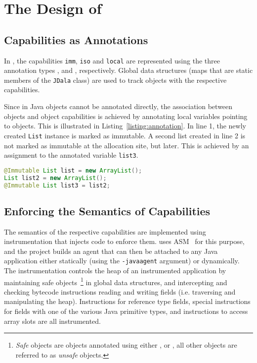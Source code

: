 \section{The Design of \jdala}
\label{sec:design}	


\subsection{Capabilities as Annotations}
\label{subsection:capabilitesAsAnnotations}

In \jdala, the \dala capabilities \texttt{imm}, \texttt{iso} and \texttt{local} are represented using the three  annotation types \Immutable, \Isolated and \Local, respectively.  Global data structures (maps that are static members of the \texttt{JDala} class) are used to track objects with the respective capabilities.   

Since in Java  objects cannot be annotated directly, the association between objects and object capabilities is achieved by annotating local variables pointing to objects.  This is illustrated in Listing~\ref{listing:annotation}.  In line 1, the newly created \texttt{List} instance is marked as immutable.  A second list created in line 2 is not marked as immutable at the allocation site, but later. This is achieved by an assignment to the annotated variable \texttt{list3}. 


\begin{lstlisting}[language=Java, caption=Associating objects with capabilities, label=listing:annotation]
@Immutable List list = new ArrayList();
List list2 = new ArrayList();
@Immutable List list3 = list2;
\end{lstlisting}


\subsection{Enforcing the Semantics of Capabilities}

The semantics of the respective capabilities are implemented using instrumentation that injects code to enforce them. 
\jdala uses ASM~\cite{bruneton2002asm} for this purpose, and the project builds an agent that can then be attached to any Java application either statically (using the \texttt{-javaagent} argument) or dynamically.
The instrumentation controls the heap of an instrumented application by maintaining safe objects~\footnote{\textit{Safe} objects are objects annotated using either \Immutable, \Isolated or \Local, all other objects are referred to as \textit{unsafe} objects.} in global data structures, and intercepting and checking bytecode instructions reading and writing fields (i.e. traversing and manipulating the heap).  Instructions for reference type fields, special instructions for fields with one of the various Java primitive types, and instructions to access array slots are all instrumented. 

